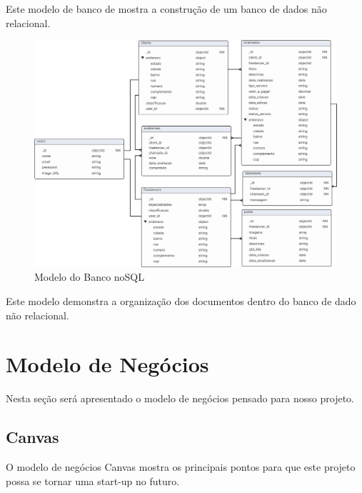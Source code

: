 \documentclass[
  a4paper,%
  12pt,%
  english,%
  brazilian,%
]{article}
\begin{document}
    Este modelo de banco de mostra a construção de um banco de dados não relacional.

\begin{figure}[h]
\centering
\caption{Modelo do Banco noSQL}%
\label{fig:diagrama-objetos}
 \includegraphics[width=1\textwidth]{fotos/ModeloBDnoSQL.png}
\end{figure}

    Este modelo demonstra a organização dos documentos dentro do banco de dado não relacional.

\break

\section*{Modelo de Negócios}
    Nesta seção será apresentado o modelo de negócios pensado para nosso projeto.


\subsection*{Canvas}

    O modelo de negócios Canvas mostra os principais pontos para que este projeto possa se tornar uma start-up no futuro.
\end{document}
